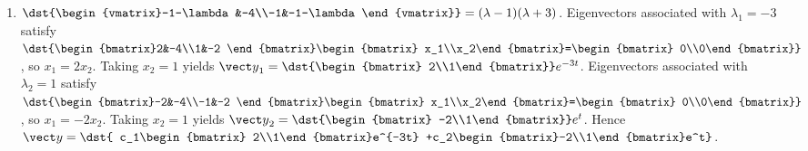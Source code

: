 \documentclass[openany]{book}
\newenvironment{sectionSolutions}{
 \begin{enumerate}[item-label={\thesection.\arabic{enumi}.}]
}{
 \end{enumerate}
}
\begin{document}
\begin{sectionSolutions}
\item
$\dst{\begin{vmatrix}-1-\lambda&-4\\-1&-1-\lambda\end{vmatrix}}
=(\lambda-1)(\lambda+3)$.
Eigenvectors  associated with $\lambda_1=-3$ satisfy
$\dst{\begin{bmatrix}2&-4\\1&-2
\end{bmatrix}\begin{bmatrix}
x_1\\x_2\end{bmatrix}=\begin{bmatrix} 0\\0\end{bmatrix}}$,
so $x_1=2x_2$.  Taking $x_2=1$ yields
${\vect y}_1=\dst{\begin{bmatrix}
2\\1\end{bmatrix}}e^{-3t}$.
Eigenvectors  associated with $\lambda_2=1$  satisfy
$\dst{\begin{bmatrix}-2&-4\\-1&-2
\end{bmatrix}\begin{bmatrix}
x_1\\x_2\end{bmatrix}=\begin{bmatrix} 0\\0\end{bmatrix}}$,
so $x_1=-2x_2$.  Taking $x_2=1$ yields
${\vect y}_2=\dst{\begin{bmatrix} -2\\1\end{bmatrix}}e^t$.
Hence  ${\vect y}=\dst{ c_1\begin{bmatrix} 2\\1\end{bmatrix}e^{-3t}
+c_2\begin{bmatrix}-2\\1\end{bmatrix}e^t}$.



\end{sectionSolutions}
\end{document}
